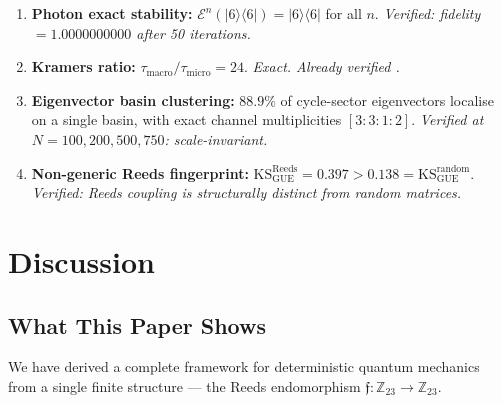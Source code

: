 \documentclass[12pt,a4paper]{article}
\theoremstyle{definition}
\theoremstyle{remark}
\newcommand{\Reeds}{\mathfrak{f}}
\newcommand{\Zp}{\mathbb{Z}_{23}}
\newcommand{\Kraus}{\mathcal{E}}
\begin{document}
\begin{enumerate}
  \item \textbf{Photon exact stability:} $\Kraus^n(|6\rangle\langle 6|) = |6\rangle\langle 6|$ for all $n$.
  \emph{Verified: fidelity $= 1.0000000000$ after 50 iterations.}

  \item \textbf{Kramers ratio:} $\tau_{\text{macro}}/\tau_{\text{micro}} = 24$.
  \emph{Exact. Already verified \cite{dwr_pvsnp}.}

  \item \textbf{Eigenvector basin clustering:} $88.9\%$ of cycle-sector
  eigenvectors localise on a single basin, with exact channel multiplicities
  $[3{:}3{:}1{:}2]$. \emph{Verified at $N = 100, 200, 500, 750$: scale-invariant.}

  \item \textbf{Non-generic Reeds fingerprint:}
  $\mathrm{KS}_{\text{GUE}}^{\text{Reeds}} = 0.397 > 0.138 = \mathrm{KS}_{\text{GUE}}^{\text{random}}$.
  \emph{Verified: Reeds coupling is structurally distinct from random matrices.}
\end{enumerate}

\section{Discussion}
\label{sec:discussion}

\subsection{What This Paper Shows}

We have derived a complete framework for deterministic quantum mechanics from a
single finite structure --- the Reeds endomorphism $\Reeds: \Zp \to \Zp$.
\end{document}

